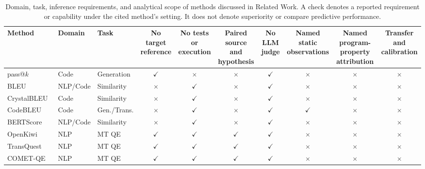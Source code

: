 \documentclass[conference]{IEEEtran}
\begin{document}
\begin{table}[t]
\centering
\caption{Domain, task, inference requirements, and analytical scope of methods discussed in Related Work. A check denotes a reported requirement or capability under the cited method's setting. It does not denote superiority or compare predictive performance.}
\label{tab:reference-free-comparison}
\scriptsize
\setlength{\tabcolsep}{2.6pt}
\begin{tabular}{@{}lllccccccc@{}}
\toprule
Method & Domain & Task & \shortstack{No target\\reference} & \shortstack{No tests or\\execution} & \shortstack{Paired source\\and hypothesis} & \shortstack{No LLM\\judge} & \shortstack{Named static\\observations} & \shortstack{Named program-\\property attribution} & \shortstack{Transfer and\\calibration} \\
\midrule
pass@$k$~\cite{chen2021evaluating} & Code & Generation & $\checkmark$ & $\times$ & $\times$ & $\checkmark$ & $\times$ & $\times$ & $\times$ \\
BLEU~\cite{papineni2002bleu} & NLP/Code & Similarity & $\times$ & $\checkmark$ & $\times$ & $\checkmark$ & $\times$ & $\times$ & $\times$ \\
CrystalBLEU~\cite{eghbali2022crystalbleu} & Code & Similarity & $\times$ & $\checkmark$ & $\times$ & $\checkmark$ & $\times$ & $\times$ & $\times$ \\
CodeBLEU~\cite{ren2020codebleu} & Code & Gen./Trans. & $\times$ & $\checkmark$ & $\times$ & $\checkmark$ & $\checkmark$ & $\times$ & $\times$ \\
BERTScore~\cite{zhang2020bertscore} & NLP/Code & Similarity & $\times$ & $\checkmark$ & $\times$ & $\checkmark$ & $\times$ & $\times$ & $\times$ \\
OpenKiwi~\cite{kepler2019openkiwi} & NLP & MT QE & $\checkmark$ & $\checkmark$ & $\checkmark$ & $\checkmark$ & $\times$ & $\times$ & $\times$ \\
TransQuest~\cite{ranasinghe2020transquest} & NLP & MT QE & $\checkmark$ & $\checkmark$ & $\checkmark$ & $\checkmark$ & $\times$ & $\times$ & $\times$ \\
COMET-QE~\cite{rei2022cometkiwi,rei2023scalingcometkiwi} & NLP & MT QE & $\checkmark$ & $\checkmark$ & $\checkmark$ & $\checkmark$ & $\times$ & $\times$ & $\times$ \\

\end{tabular}
\end{table}
\end{document}
